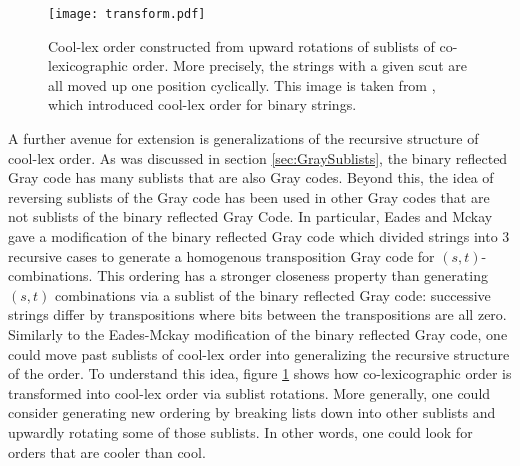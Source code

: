 \begin{figure}
\begin{center}
        \texttt{[image: transform.pdf]}
\end{center}
        \cprotect\caption{Cool-lex order constructed from upward rotations of sublists of co-lexicographic order.  More precisely, the strings with a given scut are all moved up one position cyclically.  This image is taken from \cite{ruskey2005generating,ruskey2009coolest}, which introduced cool-lex order for binary strings. }
\label{fig:cooltransform}
\end{figure}

A further avenue for extension is generalizations of the recursive structure of cool-lex order.  As was discussed in section \ref{sec:GraySublists}, the binary reflected Gray code has many sublists that are also Gray codes.  Beyond this, the idea of reversing sublists of the Gray code has been used in other Gray codes that are not sublists of the binary reflected Gray Code.  In particular, Eades and Mckay gave a modification of the binary reflected Gray code which divided strings into 3 recursive cases to generate a homogenous transposition Gray code for $(s,t)$-combinations. This ordering has a stronger closeness property than generating $(s,t)$ combinations via a sublist of the binary reflected Gray code: successive strings differ by transpositions where bits between the transpositions are all zero.  Similarly to the Eades-Mckay modification of the binary reflected Gray code, one could move past sublists of cool-lex order into generalizing the recursive structure of the order.  To understand this idea, figure \ref{fig:cooltransform} shows how co-lexicographic order is transformed into cool-lex order via sublist rotations.  More generally, one could consider generating new ordering by breaking lists down into other sublists and upwardly rotating some of those sublists. In other words, one could look for orders that are cooler than cool. 

